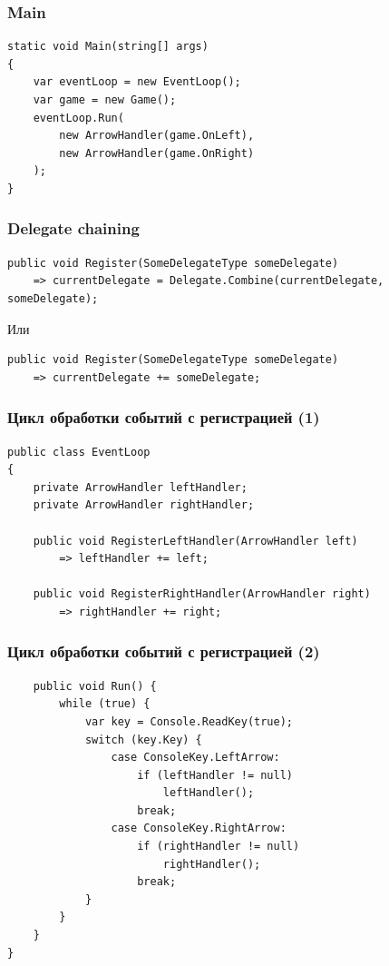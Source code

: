 \documentclass{../../slides-style}
\begin{document}
    \begin{frame}[fragile]
        \frametitle{Main}
        \begin{verbatim}
static void Main(string[] args)
{
    var eventLoop = new EventLoop();
    var game = new Game();
    eventLoop.Run(
        new ArrowHandler(game.OnLeft), 
        new ArrowHandler(game.OnRight)
    );
}
        \end{verbatim}
    \end{frame}

    \begin{frame}[fragile]
        \frametitle{Delegate chaining}
        \begin{verbatim}
public void Register(SomeDelegateType someDelegate)
    => currentDelegate = Delegate.Combine(currentDelegate, someDelegate);
        \end{verbatim}
        \vspace{3mm}
        Или
        \begin{verbatim}
public void Register(SomeDelegateType someDelegate)
    => currentDelegate += someDelegate;
        \end{verbatim}
    \end{frame}

    \begin{frame}[fragile]
        \frametitle{Цикл обработки событий с регистрацией (1)}
        \begin{verbatim}
public class EventLoop
{
    private ArrowHandler leftHandler;
    private ArrowHandler rightHandler;

    public void RegisterLeftHandler(ArrowHandler left)
        => leftHandler += left;

    public void RegisterRightHandler(ArrowHandler right)
        => rightHandler += right;
        \end{verbatim}
    \end{frame}

    \begin{frame}[fragile]
        \frametitle{Цикл обработки событий с регистрацией (2)}
        \begin{verbatim}
    public void Run() {
        while (true) {
            var key = Console.ReadKey(true);
            switch (key.Key) {
                case ConsoleKey.LeftArrow:
                    if (leftHandler != null)
                        leftHandler();
                    break;
                case ConsoleKey.RightArrow:
                    if (rightHandler != null)
                        rightHandler();
                    break;
            }
        }
    }
}
        \end{verbatim}
    \end{frame}
\end{document}
